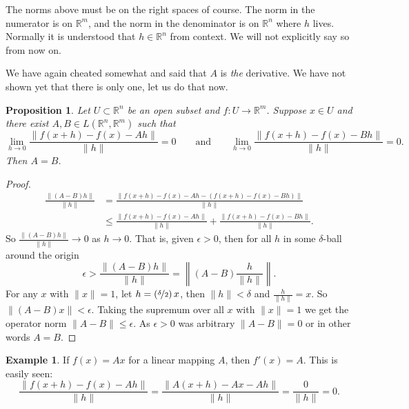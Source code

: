 \documentclass[12pt]{book}
\newcommand{\snorm}[1]{\lVert {#1} \rVert}
\newcommand{\norm}[1]{\left\lVert {#1} \right\rVert}
\newcommand{\R}{{\mathbb{R}}}
\theoremstyle{plain}
\newtheorem{prop}[thm]{Proposition}
\theoremstyle{remark}
\theoremstyle{definition}
\theoremstyle{exercise}
\theoremstyle{example}
\newtheorem{example}[thm]{Example}
\begin{document}
The norms above must be on the right spaces of course.  The norm in the
numerator is on $\R^m$, and the norm in the denominator is on $\R^n$ where $h$
lives.
Normally it is 
understood that $h \in \R^n$ from context.
We will not explicitly say so from now on.

We have again cheated somewhat and said that $A$
is \emph{the} derivative.  We have not shown yet that there
is only one, let us do that now.

\begin{prop}
Let $U \subset \R^n$ be an open subset and $f \colon U \to \R^m$.  Suppose
$x \in U$ and there exist 
$A,B \in L(\R^n,\R^m)$ such that
\begin{equation*}
\lim_{h \to 0}
\frac{\snorm{f(x+h)-f(x) - Ah}}{\snorm{h}} = 0
\qquad \text{and} \qquad
\lim_{h \to 0}
\frac{\snorm{f(x+h)-f(x) - Bh}}{\snorm{h}} = 0 .
\end{equation*}
Then $A=B$.
\end{prop}

\begin{proof}
\begin{equation*}
\begin{split}
\frac{\snorm{(A-B)h}}{\snorm{h}} & =
\frac{\snorm{f(x+h)-f(x) - Ah - (f(x+h)-f(x) - Bh)}}{\snorm{h}} \\
& \leq
\frac{\snorm{f(x+h)-f(x) - Ah}}{\snorm{h}} + \frac{\snorm{f(x+h)-f(x) -
Bh}}{\snorm{h}} .
\end{split}
\end{equation*}
So 
$\frac{\snorm{(A-B)h}}{\snorm{h}} \to 0$ as $h \to 0$.  That is, given
$\epsilon > 0$, then for all $h$ in some $\delta$-ball around
the origin
\begin{equation*}
\epsilon > 
\frac{\snorm{(A-B)h}}{\snorm{h}}
=
\norm{(A-B)\frac{h}{\snorm{h}}} .
\end{equation*}
For any $x$ with $\snorm{x}=1$,
let $h = (\nicefrac{\delta}{2}) \, x$, then $\snorm{h} < \delta$
and $\frac{h}{\snorm{h}} = x$.
So $\snorm{(A-B)x} < \epsilon$.  Taking the supremum over all $x$ with
$\snorm{x} = 1$ we get the operator norm
$\snorm{A-B} \leq \epsilon$.  As $\epsilon > 0$
was arbitrary $\snorm{A-B} = 0$ or in other words $A = B$.
\end{proof}

\begin{example}
If $f(x) = Ax$ for a linear mapping $A$, then
$f'(x) = A$.  This is easily seen:
\begin{equation*}
\frac{\snorm{f(x+h)-f(x) - Ah}}{\snorm{h}}
=
\frac{\snorm{A(x+h)-Ax - Ah}}{\snorm{h}}
=
\frac{0}{\snorm{h}} = 0 .
\end{equation*}
\end{example}
\end{document}
